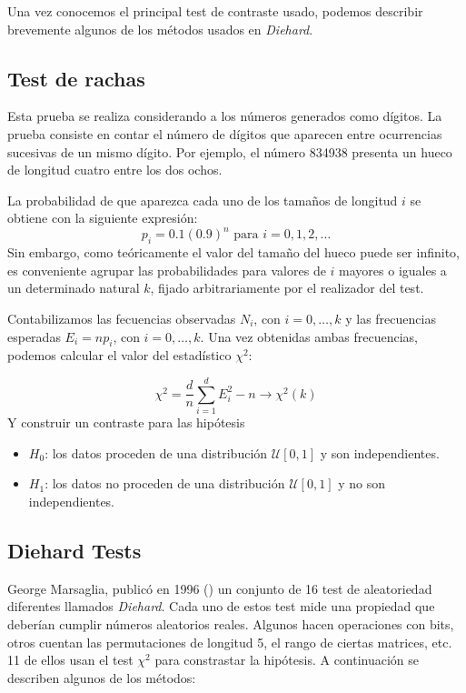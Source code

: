 Una vez conocemos el principal test de contraste usado, podemos describir brevemente algunos de los métodos usados en \textit{Diehard}.

\subsection{Test de rachas}

Esta prueba se realiza considerando a los números generados como dígitos. La prueba consiste en contar el número de dígitos que aparecen entre ocurrencias sucesivas de un mismo dígito. Por ejemplo, el número 834938 presenta un hueco de longitud cuatro entre los dos ochos.

La probabilidad de que aparezca cada uno de los tamaños de longitud $i$ se obtiene con la siguiente expresión:
\[
p_i=0.1(0.9)^n \,\, \text{para } i=0,1,2,\ldots
\]
Sin embargo, como teóricamente el valor del tamaño del hueco puede ser infinito, es conveniente agrupar las probabilidades para valores de $i$ mayores o iguales a un determinado natural $k$, fijado arbitrariamente por el realizador del test.

Contabilizamos las fecuencias observadas $N_i$, con $i=0, \ldots, k$ y las frecuencias esperadas $E_i=np_i$, con $i=0, \ldots, k$. Una vez obtenidas ambas frecuencias, podemos calcular el valor del estadístico $\chi^2$:

\[
\chi^2=\frac{d}{n}\sum_{i=1}^dE_i^2-n\longrightarrow \chi^2(k)
\]
Y construir un contraste para las hipótesis
\begin{itemize}
\item $H_0$: los datos proceden de una distribución $\mathcal{U}[0,1]$ y son independientes.
\item $H_1$: los datos no proceden de una distribución $\mathcal{U}[0,1]$ y no son independientes.
\end{itemize}

\subsection{Diehard Tests}

George Marsaglia, publicó en 1996 (\cite{marsaglia1996}) un conjunto de 16 test de aleatoriedad diferentes llamados \textit{Diehard}. Cada uno de estos test mide una propiedad que deberían cumplir números aleatorios reales. Algunos hacen operaciones con bits, otros cuentan las permutaciones de longitud 5,  el rango de ciertas matrices, etc. 11 de ellos usan el test $\chi^2$ para constrastar la hipótesis. A continuación se describen algunos de los métodos:

